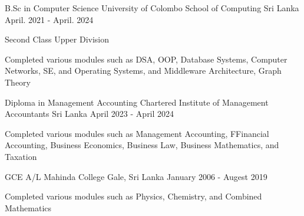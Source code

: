 

\begin{cventries}

  \cventry
  {B.Sc in Computer Science} %
  {University of Colombo School of Computing} %
  {Sri Lanka} %
  {April. 2021 - April. 2024} %
  {
    \begin{cvitems} %
      \item {Second Class Upper Division}
      \item {Completed various modules such as DSA, OOP, Database Systems, Computer Networks, SE, and Operating Systems, and Middleware Architecture, Graph Theory}
    \end{cvitems}
  }

  \cventry
  {Diploma in Management Accounting} %
  {Chartered Institute of Management Accountants} %
  {Sri Lanka} %
  {April 2023 - April 2024}
  {
    \begin{cvitems} %
      \item {Completed various modules such as Management Accounting, FFinancial Accounting, Business Economics, Business Law, Business Mathematics, and Taxation}
    \end{cvitems}
  }

  \cventry
  {GCE A/L} %
  {Mahinda College} %
  {Gale, Sri Lanka} %
  {January 2006 - Augest 2019}
  {
    \begin{cvitems} %
      \item {Completed various modules such as Physics, Chemistry, and Combined Mathematics}
    \end{cvitems}
  }

\end{cventries}
